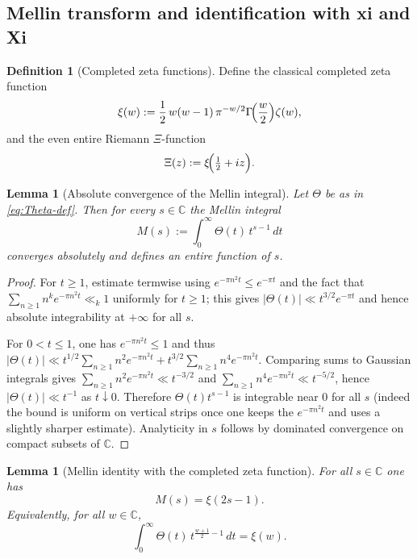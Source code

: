 \documentclass[12pt]{amsart}
\newtheorem{lemma}[theorem]{Lemma}
\theoremstyle{definition}
\newtheorem{definition}[theorem]{Definition}
\theoremstyle{remark}
\begin{document}
\subsection{Mellin transform and identification with xi and Xi}
\label{subsec:mellin-xi}

\begin{definition}[Completed zeta functions]
\label{def:xi-Xi-new}
Define the classical completed zeta function
\[
\xi(w)
:=
\frac12\,w(w-1)\,\pi^{-w/2}\Gamma\!\Bigl(\frac{w}{2}\Bigr)\zeta(w),
\]
and the even entire Riemann $\Xi$-function
\[
\Xi(z):=\xi\!\Bigl(\tfrac12+iz\Bigr).
\]
\end{definition}

\begin{lemma}[Absolute convergence of the Mellin integral]
\label{lem:mellin-entire-new}
Let $\Theta$ be as in \eqref{eq:Theta-def}. Then for every $s\in\mathbb C$ the Mellin integral
\begin{equation}
\label{eq:M-def}
M(s):=\int_0^\infty \Theta(t)\,t^{s-1}\,dt
\end{equation}
converges absolutely and defines an entire function of $s$.
\end{lemma}

\begin{proof}
For $t\ge 1$, estimate termwise using $e^{-\pi n^2 t}\le e^{-\pi t}$ and the fact that
$\sum_{n\ge 1}n^k e^{-\pi n^2 t}\ll_k 1$ uniformly for $t\ge 1$; this gives
$|\Theta(t)|\ll t^{3/2}e^{-\pi t}$ and hence absolute integrability at $+\infty$ for all $s$.

For $0<t\le 1$, one has $e^{-\pi n^2 t}\le 1$ and thus
$|\Theta(t)|\ll t^{1/2}\sum_{n\ge 1}n^2 e^{-\pi n^2 t}+t^{3/2}\sum_{n\ge 1}n^4 e^{-\pi n^2 t}$.
Comparing sums to Gaussian integrals gives
$\sum_{n\ge 1}n^2 e^{-\pi n^2 t}\ll t^{-3/2}$ and
$\sum_{n\ge 1}n^4 e^{-\pi n^2 t}\ll t^{-5/2}$, hence $|\Theta(t)|\ll t^{-1}$ as $t\downarrow 0$.
Therefore $\Theta(t)t^{s-1}$ is integrable near $0$ for all $s$ (indeed the bound is uniform
on vertical strips once one keeps the $e^{-\pi n^2 t}$ and uses a slightly sharper estimate).
Analyticity in $s$ follows by dominated convergence on compact subsets of $\mathbb C$.
\end{proof}

\begin{lemma}[Mellin identity with the completed zeta function]
\label{lem:mellin-equals-xi-new}
For all $s\in\mathbb C$ one has
\begin{equation}
\label{eq:M-equals-xi-new}
M(s)=\xi(2s-1).
\end{equation}
Equivalently, for all $w\in\mathbb C$,
\begin{equation}
\label{eq:Theta-xi}
\int_0^\infty \Theta(t)\,t^{\frac{w+1}{2}-1}\,dt=\xi(w).
\end{equation}
\end{lemma}
\end{document}
